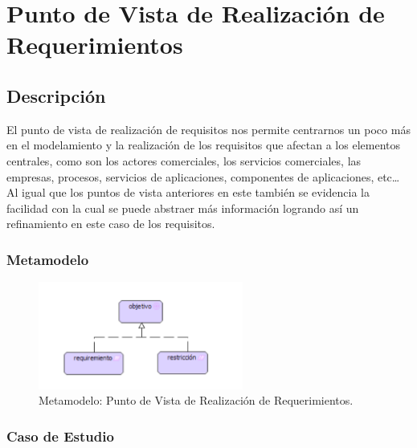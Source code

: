 \section{Punto de Vista de Realización de Requerimientos}
\subsection{Descripción}
El punto de vista de realización de requisitos nos permite centrarnos un poco más en el modelamiento y la realización de los requisitos que afectan a los elementos centrales, como son los actores comerciales, los servicios comerciales, las empresas, procesos, servicios de aplicaciones, componentes de aplicaciones, etc… Al igual que los puntos de vista anteriores en este también se evidencia la facilidad con la cual se puede abstraer más información logrando así un refinamiento en este caso de los requisitos.

\subsubsection{Metamodelo}
\begin{figure}[H]
	\centering
	\includegraphics[width=0.6\textwidth]{imagenes/Metamodelos/Motivacion/meta_Realizacion_Requerimientos.pdf}
	\caption{Metamodelo: Punto de Vista de Realización de Requerimientos.}
	\label{fig:gap_analysis}
\end{figure}

\subsubsection{Caso de Estudio}


